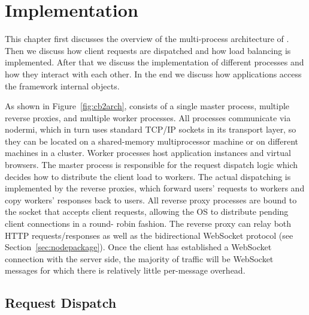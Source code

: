 \chapter{Implementation}
\label{ch:impl}

This chapter first discusses the overview of the multi-process architecture of \cbtwo.
Then we discuss how client requests are dispatched and how load balancing is implemented.
After that we discuss the implementation of different \cbtwo processes and how they interact
with each other.
In the end we discuss how \cb applications access the framework internal objects.



As shown in Figure~\ref{fig:cb2arch}, \cbtwo consists of a
single master process, multiple reverse proxies, and multiple worker
processes. All processes communicate via nodermi, which in turn uses standard TCP/IP 
sockets in its transport layer, so they can
be located on a shared-memory multiprocessor machine or on different machines in a cluster. 
Worker processes host application instances and virtual browsers. The master process is responsible for
the request dispatch logic which decides how to distribute the client load to
workers. The actual dispatching is implemented by the reverse proxies, which
forward users' requests to workers and copy workers' responses back to users.
All reverse proxy processes are bound to the socket that accepts client
requests, allowing the OS to distribute pending client connections in a round-
robin fashion.
The reverse proxy can relay both HTTP requests/responses as
well as the bidirectional WebSocket protocol (see Section~\ref{sec:nodepackage}).
Once the client has established a WebSocket connection with
the server side, the majority of traffic will be WebSocket
messages for which there is relatively little per-message overhead.

\newarchitectureoverview{}




\section{Request Dispatch}
\label{sec:reqdis}

